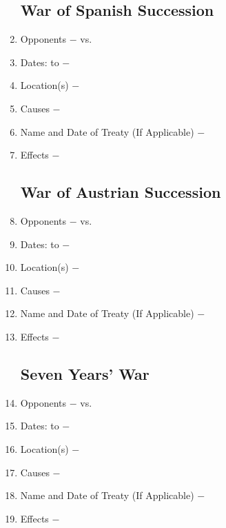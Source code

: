 \documentclass[12pt]{article}
\begin{document}
\begin{enumerate}
\subsection{War of Spanish Succession}
 
\item Opponents $-$ vs.

\item Dates: to $-$

\item Location(s) $-$ 

\item Causes $-$

\item Name and Date of Treaty (If Applicable) $-$ 

\item Effects $-$ 

\subsection{War of Austrian Succession}

\item Opponents $-$ vs.

\item Dates: to $-$

\item Location(s) $-$ 

\item Causes $-$

\item Name and Date of Treaty (If Applicable) $-$ 

\item Effects $-$ 

\subsection{Seven Years' War}

\item Opponents $-$ vs.

\item Dates: to $-$

\item Location(s) $-$ 

\item Causes $-$

\item Name and Date of Treaty (If Applicable) $-$ 

\item Effects $-$


\end{enumerate}
\end{document}
